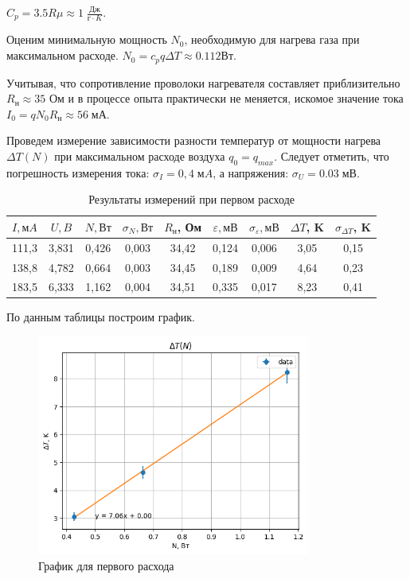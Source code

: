 \documentclass[a4paper,12pt]{article}
\begin{document}
$C_p = 3.5R\mu \approx 1 \; \frac{Дж}{г\cdot K}.$
 	
Оценим минимальную мощность $N_0$, необходимую для нагрева газа при максимальном расходе. $N_{0} = c_{p}q\Delta T \approx 0.112 {Вт}.$
	
Учитывая, что сопротивление проволоки нагревателя составляет приблизительно $R_{н} \approx 35 \text{ Ом}$ и в процессе опыта практически не меняется, искомое значение тока $I_{0} = q N_{0} R_{н} \approx 56 \; {мА}.$
	
\bigskip
Проведем измерение зависимости разности температур от мощности нагрева $\Delta T(N)$ при максимальном расходе воздуха $q_0 = q_{max}.$
Следует отметить, что погрешность измерения тока: $\sigma_{I} = 0,4 \; мA$, а  напряжения: $\sigma_{U}= 0.03 \; мВ$.

\begin{table}[H]
    \centering
    \begin{tabular}{|c|c|c|c|c|c|c|c|c|}
    \hline
        $I, мA$ & $U, B$ & $N, Вт$ & $\sigma_N, Вт$ & $R_н$, Ом  & $\varepsilon, мВ$ & $\sigma_{\varepsilon}, мВ$ & $\Delta T$, K & $\sigma_{\Delta T}$, K \\ \hline111,3 & 3,831 & 0,426 & 0,003 & 34,42 & 0,124 & 0,006 & 3,05 & 0,15 \\ \hline
        138,8 & 4,782 & 0,664 & 0,003 & 34,45 & 0,189 & 0,009 & 4,64 & 0,23 \\ \hline
        183,5 & 6,333 & 1,162 & 0,004 & 34,51 & 0,335 & 0,017 & 8,23 & 0,41 \\ \hline
    \end{tabular}
    \caption{Результаты измерений при первом расходе}
\end{table}

По данным таблицы построим график.


\begin{figure}[H]
	\begin{center}
    \includegraphics[width=0.8\textwidth]{first.png}
    \end{center}
    \caption{График для первого расхода}
\end{figure}
\end{document}
